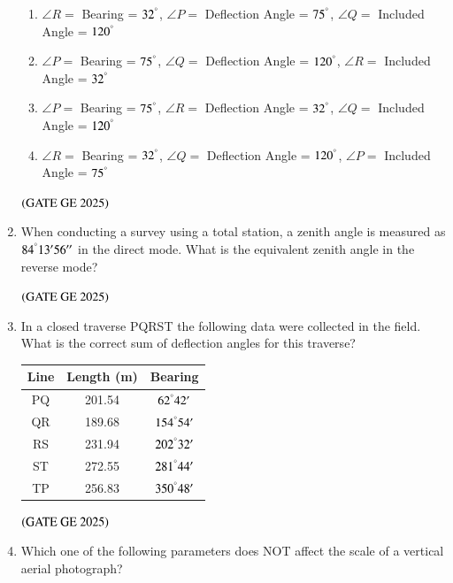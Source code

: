 \documentclass[journal,12pt,onecolumn]{IEEEtran}
\theoremstyle{remark}
\begin{document}
\begin{enumerate}
\begin{figure}[H]
    \caption{}
    \label{figs:fig8}
\end{figure}
\begin{enumerate}
\item $\angle R =$ Bearing = $32^\degree$, $\angle P =$ Deflection Angle = $75^\degree$, $\angle Q =$ Included Angle = $120^\degree$
\item $\angle P =$ Bearing = $75^\degree$, $\angle Q =$ Deflection Angle = $120^\degree$, $\angle R =$ Included Angle = $32^\degree$
\item $\angle P =$ Bearing = $75^\degree$, $\angle R =$ Deflection Angle = $32^\degree$, $\angle Q =$ Included Angle = $120^\degree$
\item $\angle R =$ Bearing = $32^\degree$, $\angle Q =$ Deflection Angle = $120^\degree$, $\angle P =$ Included Angle = $75^\degree$
\end{enumerate}
\hfill $\left(\text{GATE GE 2025}\right)$
\bigskip
\item When conducting a survey using a total station, a zenith angle is measured as $84^\degree13'56''$ in the direct mode. What is the equivalent zenith angle in the reverse mode?
\begin{enumerate}
\end{enumerate}
\hfill $\left(\text{GATE GE 2025}\right)$
\bigskip
\item In a closed traverse PQRST the following data were collected in the field. What is the correct sum of deflection angles for this traverse?
\begin{table}[h]
\centering
\begin{tabular}{|c|c|c|}
\hline
Line & Length (m) & Bearing \\
\hline
PQ & 201.54 & $62^\degree42'$ \\
QR & 189.68 & $154^\degree54'$ \\
RS & 231.94 & $202^\degree32'$ \\
ST & 272.55 & $281^\degree44'$ \\
TP & 256.83 & $350^\degree48'$ \\
\hline
\end{tabular}
\end{table}
\begin{enumerate}
\end{enumerate}
\hfill $\left(\text{GATE GE 2025}\right)$
\bigskip
\item Which one of the following parameters does NOT affect the scale of a vertical aerial photograph?


\end{enumerate}
\end{document}
